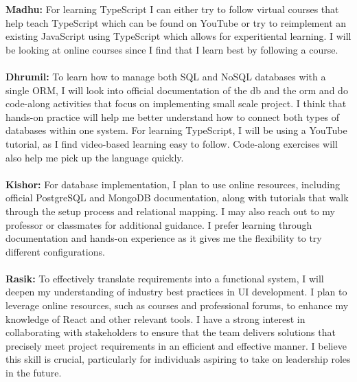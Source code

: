 \documentclass[12pt]{article}
\begin{document}
\begin{enumerate}
  \textbf{Madhu:} For learning TypeScript I can either try to follow virtual courses that help teach TypeScript which can be found on YouTube or try to reimplement an existing JavaScript using TypeScript which allows for experitiental learning. I will be looking at online courses since I find that I learn best by following a course. \\\\
  \textbf{Dhrumil:} To learn how to manage both SQL and NoSQL databases with a single ORM, I will look into official documentation of the db and the orm and do code-along activities that focus on implementing small scale project. I think that hands-on practice will help me better understand how to connect both types of databases within one system. For learning TypeScript, I will be using a YouTube tutorial, as I find video-based learning easy to follow. Code-along exercises will also help me pick up the language quickly.\\\\
  \textbf{Kishor: } For database implementation, I plan to use online resources, including official PostgreSQL and MongoDB documentation, along with tutorials that walk through the setup process and relational mapping. I may also reach out to my professor or classmates for additional guidance. I prefer learning through documentation and hands-on experience as it gives me the flexibility to try different configurations.\\\\
    \textbf{Rasik: } To effectively translate requirements into a functional system, I will deepen my understanding of industry best practices in UI development. I plan to leverage online resources, such as courses and professional forums, to enhance my knowledge of React and other relevant tools. I have a strong interest in collaborating with stakeholders to ensure that the team delivers solutions that precisely meet project requirements in an efficient and effective manner. I believe this skill is crucial, particularly for individuals aspiring to take on leadership roles in the future.  \\\\
\end{enumerate}
\end{document}
